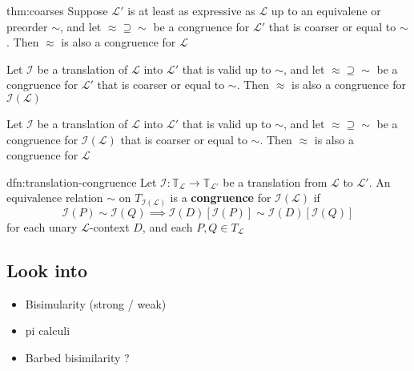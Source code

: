 \documentclass{article}
\begin{document}
\begin{thm}{thm:coarses}{}
    Suppose $\mathcal{L}'$ is at least as expressive as $\mathcal{L}$ up to an equivalene or preorder $\sim$, and let $\approx \supseteq \sim$ be a congruence for $\mathcal{L}'$ that is coarser or equal to $\sim$. Then $\approx$ is also a congruence for $\mathcal{L}$
    
    \longrule{0.08ex}

    Let $\mathcal{I}$ be a translation of $\mathcal{L}$ into $\mathcal{L}'$ that is valid up to $\sim$, and let $\approx \supseteq \sim$ be a congruence for $\mathcal{L}'$ that is coarser or equal to $\sim$. Then $\approx$ is also a congruence for $\mathcal{I}(\mathcal{L})$

    \longrule{0.08ex}

    Let $\mathcal{I}$ be a translation of $\mathcal{L}$ into $\mathcal{L}'$ that is valid up to $\sim$, and let $\approx \supseteq \sim$ be a congruence for $\mathcal{I}(\mathcal{L})$ that is coarser or equal to $\sim$. Then $\approx$ is also a congruence for $\mathcal{L}$
\end{thm}

\begin{dfn}{dfn:translation-congruence}{}
    Let $\mathcal{I} : \mathbb{T}_{\mathcal{L}} \to \mathbb{T}_{\mathcal{L}'}$ be a translation from $\mathcal{L}$ to $\mathcal{L}'$. An equivalence relation $\sim$ on $T_{\mathcal{I}(\mathcal{L})}$ is a \textbf{congruence} for $\mathcal{I}(\mathcal{L})$ if
    \[\mathcal{I}(P) \sim \mathcal{I}(Q) \implies \mathcal{I}(D)[\mathcal{I}(P)] \sim \mathcal{I}(D)[\mathcal{I}(Q)]\]
    for each unary $\mathcal{L}$-context $D$, and each $P, Q\in T_{\mathcal{L}}$
\end{dfn}



\subsection{Look into}
\begin{itemize}
    \item Bisimularity (strong / weak)
    \item pi calculi
    \item Barbed bisimilarity ?
\end{itemize}
\end{document}
